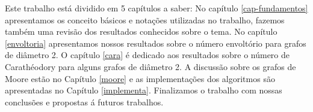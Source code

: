 Este trabalho está dividido em 5 capítulos a saber: No capítulo \ref{cap-fundamentos} apresentamos os conceito básicos e notações utilizadas no trabalho, fazemos também uma revisão dos resultados conhecidos sobre o tema. No capítulo \ref{envoltoria} apresentamos nossos resultados sobre o número envoltório para grafos de diâmetro 2.
O capítulo \ref{cara} é dedicado aos resultados sobre o número de Carathéodory para alguns grafos de diâmetro 2.%
 A discussão sobre os grafos de Moore estão no Capítulo \ref{moore} e as implementações dos algoritmos são apresentadas no Capítulo \ref{implementa}. Finalizamos o trabalho com nossas conclusões e propostas á futuros trabalhos.

